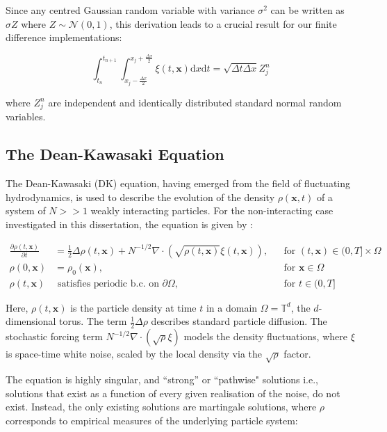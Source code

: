 Since any centred Gaussian random variable with variance $\sigma^2$ can be written as $\sigma Z$ where 
$Z \sim \mathcal{N}(0,1)$, this derivation leads to a crucial 
result for our finite difference implementations:

\begin{equation}\label{eq:white_noise_result}
    \int_{t_n}^{t_{n+1}} \int_{x_j - \frac{\Delta x}{2}}^{x_j + \frac{\Delta x}{2}} \xi(t, \mathbf{x})
    \mathrm{d}x \mathrm{d}t = \sqrt{\Delta t \Delta x} Z_j^n
\end{equation}

where $Z_j^n$ are independent and identically distributed standard normal random variables.

\subsection{The Dean-Kawasaki Equation}

The Dean-Kawasaki (DK) equation, having emerged from the field of fluctuating 
hydrodynamics, is used to describe the evolution of the density 
$\rho(\mathbf{x}, t)$ of a system of $N >> 1$ weakly interacting particles.
For the non-interacting case investigated in this dissertation, the equation is given by
\cite{cornalba2025multilevel}:

\begin{align}\label{eq:dk_spde_2}
\frac{\partial \rho(t, \mathbf{x})}{\partial t} &=
\frac{1}{2}\Delta\rho(t, \mathbf{x}) + N^{-1/2}\nabla\cdot(\sqrt{\rho(t, \mathbf{x})}\xi(t, \mathbf{x})), 
&& \text{for } (t, \mathbf{x}) \in (0, T] \times \Omega \tag{DK} \\
\rho(0, \mathbf{x}) &= \rho_0(\mathbf{x}), && \text{for } \mathbf{x} \in \Omega \nonumber \\
\rho(t, \mathbf{x}) &\text{ satisfies periodic b.c. on } \partial \Omega, && \text{for } t \in (0, T] \nonumber
\end{align}

Here, $\rho(t, \mathbf{x})$ is the particle density at time $t$ in a 
domain $\Omega = \mathbb{T}^d$, the $d$-dimensional torus. 
The term $\frac{1}{2} \Delta \rho$ describes
standard particle diffusion. The stochastic forcing term $N^{-1/2}
\nabla \cdot (\sqrt{\rho}\xi)$ models the density fluctuations,
where $\xi$ is space-time white noise, scaled by the local density 
via the $\sqrt{\rho}$ factor.


The equation is highly singular, and ``strong'' or ``pathwise" solutions 
i.e., solutions that exist as a function of every given realisation 
of the noise, do not exist. Instead, the only existing solutions are martingale 
solutions, where $\rho$ corresponds to empirical measures of the underlying 
particle system:

